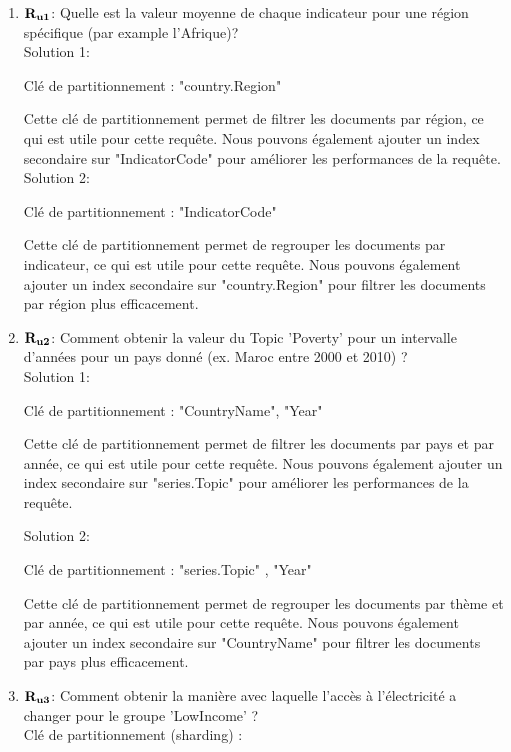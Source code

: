 \begin{enumerate}
    \item ${\bf R_{u1}}$: Quelle est la valeur moyenne de chaque indicateur pour une région spécifique (par example l’Afrique)?\\

Solution 1:

Clé de partitionnement : "country.Region"

Cette clé de partitionnement permet de filtrer les documents par région, ce qui est utile pour cette requête. Nous pouvons également ajouter un index secondaire sur "IndicatorCode" pour améliorer les performances de la requête.\\

Solution 2:

Clé de partitionnement : "IndicatorCode"

Cette clé de partitionnement permet de regrouper les documents par indicateur, ce qui est utile pour cette requête. Nous pouvons également ajouter un index secondaire sur "country.Region" pour filtrer les documents par région plus efficacement.

    \item ${\bf R_{u2}}$: Comment obtenir la valeur du Topic ’Poverty’ pour un intervalle d’années pour un pays donné (ex. Maroc entre 2000 et 2010) ?\\

Solution 1:

Clé de partitionnement : "CountryName", "Year"

Cette clé de partitionnement permet de filtrer les documents par pays et par année, ce qui est utile pour cette requête. Nous pouvons également ajouter un index secondaire sur "series.Topic" pour améliorer les performances de la requête.

Solution 2:

Clé de partitionnement : "series.Topic" , "Year"

Cette clé de partitionnement permet de regrouper les documents par thème et par année, ce qui est utile pour cette requête. Nous pouvons également ajouter un index secondaire sur "CountryName" pour filtrer les documents par pays plus efficacement.

    \item ${\bf R_{u3}}$: Comment obtenir la manière avec laquelle l’accès à l’électricité a changer pour le groupe ’LowIncome’ ?\\

Clé de partitionnement (sharding) :


\end{enumerate}
